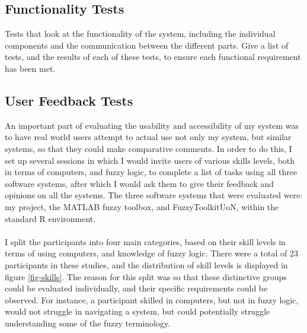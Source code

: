 {\color{blue}


\subsection{Functionality Tests}
{\color{red} 
Tests that look at the functionality of the system, including the individual components and the communication between the different parts. Give a list of tests, and the results of each of these tests, to ensure each functional requirement has been met.
}

\subsection{User Feedback Tests}
An important part of evaluating the usability and accessibility of my system was to have real world users attempt to actual use not only my system, but similar systems, so that they could make comparative comments. In order to do this, I set up several sessions in which I would invite users of various skills levels, both in terms of computers, and fuzzy logic, to complete a list of tasks using all three software systems, after which I would ask them to give their feedback and opinions on all the systems. The three software systems that were evaluated were: my project, the MATLAB fuzzy toolbox, and FuzzyToolkitUoN, within the standard R environment.\ \\
\ \\
I split the participants into four main categories, based on their skill levels in terms of using computers, and knowledge of fuzzy logic. There were a total of 23 participants in these studies, and the distribution of skill levels is displayed in figure \ref{fig-skills}. The reason for this split was so that these distinctive groups could be evaluated individually, and their specific requirements could be observed. For instance, a participant skilled in computers, but not in fuzzy logic, would not struggle in navigating a system, but could potentially struggle understanding some of the fuzzy terminology.

}
